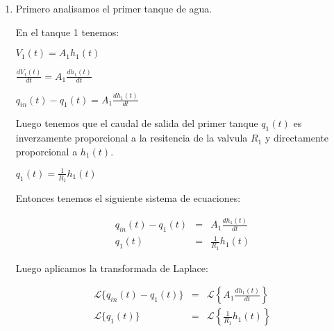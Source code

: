 \documentclass[12pt]{article}
\begin{document}
\begin{enumerate}
  \item Primero analisamos el primer tanque de agua.\\


    En el tanque 1 tenemos: 

    \(\displaystyle V_{1}(t)=A_{1}h_{1}(t)\)

    \( \displaystyle \frac{dV_{1}(t)}{dt}=A_{1}\frac{dh_{1}(t)}{dt} \)

    \( \displaystyle q_{in}(t)-q_{1}(t) = A_{1}\frac{dh_{1}(t)}{dt} \)

    Luego tenemos que el caudal de salida del primer tanque $q_{1}(t)$ es inverzamente
    proporcional a la resitencia de la valvula $R_{1}$ y directamente proporcional a $h_{1}(t)$.

    \( \displaystyle q_{1}(t)=\frac{1}{R_{1}}h_{1}(t)\)

    Entonces tenemos el siguiente sistema de ecuaciones:

    \begin{eqnarray}
      q_{in}(t)-q_{1}(t) &=& A_{1}\frac{dh_{1}(t)}{dt} \\
      q_{1}(t) &=& \frac{1}{R_{1}}h_{1}(t)
    \end{eqnarray}

    Luego aplicamos la transformada de Laplace:
 
    \begin{eqnarray*}
      \mathscr{L}\{q_{in}(t)-q_{1}(t)\} &=& \mathscr{L} \left\{ A_{1}\frac{dh_{1}(t)}{dt} \right\} \\[2mm]
      \mathscr{L}\{q_{1}(t)\} &=&\mathscr{L} \left \{ \frac{1}{R_{1}}h_{1}(t) \right\}
    \end{eqnarray*}


\end{enumerate}
\end{document}
